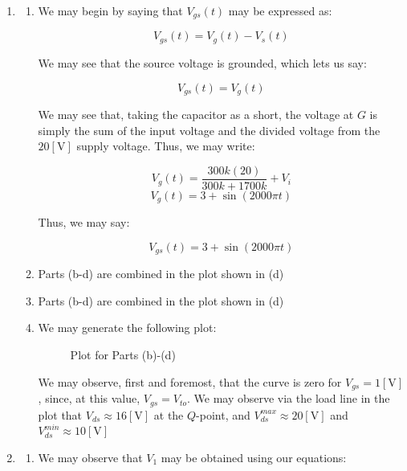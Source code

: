 \begin{enumerate}

  \item
    
    \begin{enumerate}

      \item We may begin by saying that $V_{gs}(t)$ may be expressed as:

        $$V_{gs}(t)=V_{g}(t)-V_{s}(t)$$

        We may see that the source voltage is grounded, which lets us say:

        $$V_{gs}(t)=V_{g}(t)$$

        We may see that, taking the capacitor as a short, the voltage at $G$ is simply the sum of the input voltage and the divided voltage from the $20[\si{\volt}]$ supply voltage. Thus, we may write:

        $$V_g(t)=\frac{300k(20)}{300k+1700k}+V_i$$
        $$V_g(t)=3+\sin(2000\pi t)$$

        Thus, we may say:

        $$\boxed{V_{gs}(t)=3+\sin(2000\pi t)}$$

      \item Parts (b-d) are combined in the plot shown in (d)

      \item Parts (b-d) are combined in the plot shown in (d)

      \item We may generate the following plot:

        \begin{figure}[H]
          \centering
          
          \caption{Plot for Parts (b)-(d)}
          \label{fig:1}
        \end{figure}

        We may observe, first and foremost, that the curve is zero for $V_{gs}=1[\si{\volt}]$, since, at this value, $V_{gs}=V_{to}$. We may observe via the load line in the plot that $V_{ds}\approx16[\si{\volt}]$ at the $Q$-point, and $V_{ds}^{max}\approx20[\si{\volt}]$ and $V_{ds}^{min}\approx10[\si{\volt}]$

    \end{enumerate}

  \item

    \begin{enumerate}

      \item We may observe that $V_1$ may be obtained using our equations:


\end{enumerate}
\end{enumerate}
